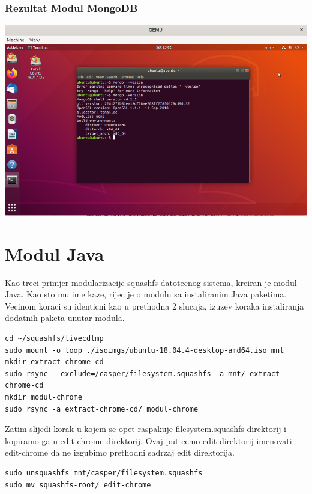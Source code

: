 \documentclass[12pt,vi]{mitthesis}
\begin{document}
\subsection*{Rezultat Modul MongoDB}
\includegraphics[width=\linewidth]{images/mongoLive.png} 

\chapter*{Modul Java}
Kao treci primjer modularizacije squashfs datotecnog sistema, kreiran je modul Java. Kao sto mu ime kaze, rijec je o modulu sa instaliranim Java paketima. Vecinom koraci su identicni kao u prethodna 2 slucaja, izuzev koraka instaliranja dodatnih paketa unutar modula.\\
\begin{lstlisting}[style=BashInputStyle]
cd ~/squashfs/livecdtmp
sudo mount -o loop ./isoimgs/ubuntu-18.04.4-desktop-amd64.iso mnt
mkdir extract-chrome-cd
sudo rsync --exclude=/casper/filesystem.squashfs -a mnt/ extract-chrome-cd
mkdir modul-chrome
sudo rsync -a extract-chrome-cd/ modul-chrome
\end{lstlisting}
Zatim slijedi korak u kojem se opet raspakuje filesystem.squashfs direktorij i kopiramo ga u edit-chrome direktorij. Ovaj put cemo edit direktorij imenovati edit-chrome da ne izgubimo prethodni sadrzaj edit direktorija.\\
\begin{lstlisting}[style=BashInputStyle]
sudo unsquashfs mnt/casper/filesystem.squashfs
sudo mv squashfs-root/ edit-chrome
\end{lstlisting}
\end{document}
